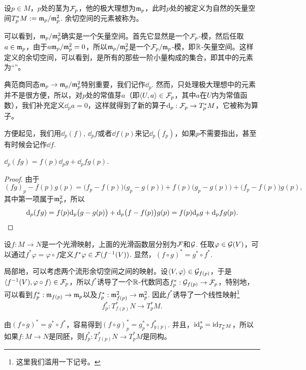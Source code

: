 \begin{para}[余切空间]
设$p\in M$，$p$处的茎为$\mathcal{F}_p$，他的极大理想为$\mathfrak{m}_p$，此时$p$处的被定义为自然的矢量空间$T_p^*M:=\mathfrak{m}_p/\mathfrak{m}_p^2$. 余切空间的元素被称为。
\end{para}

可以看到，$\mathfrak{m}_p/\mathfrak{m}_p^2$确实是一个矢量空间。首先它显然是一个$\mathcal{F}_p$-模，然后任取$a\in \mathfrak{m}_p$，由于$a\mathfrak{m}_p/\mathfrak{m}_p^2=0$，所以$\mathfrak{m}_p/\mathfrak{m}_p^2$是一个$\mathcal{F}_p/\mathfrak{m}_p$-模，即$\mathbb{R}$-矢量空间。这样定义的余切空间，可以看到，是所有的那些一阶小量构成的集合，即其中的元素为“”。

\begin{para}[微分算子]
典范商同态$\mathfrak{m}_p\to \mathfrak{m}_p/\mathfrak{m}_p^2$特别重要，我们记作$\dd_p$. 然而，只处理极大理想中的元素并不是很方便，所以，对$p$处的常值芽$a$（即$\langle U,a\rangle\in\mathcal{F}_p$，其中$a$在$U$内为常值函数），我们补充定义$\dd_pa=0$，这样就得到了新的算子$\mathrm{d}_p:\mathcal{F}_p\to T_p^*M$，它被称为算子。
\end{para}

方便起见，我们用$\dd_p(f)$, $\dd_pf$或者$\dd f(p)$来记$\dd_p(f_p)$，如果$p$不需要指出，甚至有时候会记作$\dd f$. 

\begin{pro}[Leibniz法则]
$\dd_p (fg)=f(p)\dd_pg+\dd_pf g(p)$.
\end{pro}


\begin{proof}
由于
\[
	(fg)_p-f(p)g(p)=\bigl(f_p-f(p)\bigr)\bigl(g_p-g(p)\bigr)+f(p)\bigl(g_p-g(p)\bigr)+\bigl(f_p-f(p)\bigr)g(p),
\]
其中第一项属于$\mathfrak{m}_p^2$，所以
\[
\mathrm{d}_p (fg)=f(p)\mathrm{d}_p\bigl(g-g(p)\bigr)+\mathrm{d}_p\bigl(f-f(p)\bigr)g(p)=f(p)\mathrm{d}_pg+\mathrm{d}_pf g(p).\qedhere
\]
\end{proof}

\begin{para}[拉回映射]
设$f:M\to N$是一个光滑映射，上面的光滑函数层分别为$\mathcal{F}$和$\mathcal{G}$. 任取$\varphi\in \mathcal{G}(V)$，可以通过$f^*\varphi=\varphi\circ f$定义$f^*\varphi\in \mathcal{F}(f^{-1}(V))$. 显然，$(f\circ g)^*=g^*\circ f^*$.

局部地，可以考虑两个流形余切空间之间的映射。设$\langle V,\varphi\rangle\in \mathcal{G}_{f(p)}$，于是$\langle f^{-1}(V),\varphi\circ f\rangle\in \mathcal{F}_p$，所以$f^*$诱导了一个$\mathbb{R}$-代数同态$f^*_p:\mathcal{G}_{f(p)}\to \mathcal{F}_p$，特别地，可以看到$f^*_p:\mathfrak{m}_{f(p)}\to \mathfrak{m}_{p}$以及$f^*_p:\mathfrak{m}^2_{f(p)}\to \mathfrak{m}^2_{p}$. 因此$f^*$诱导了一个线性映射\footnote{这里我们滥用一下记号。}
\[
	f^*_p:T_{f(p)}^*N\to T_p^*M.
\]

由$(f\circ g)^*=g^*\circ f^*$，容易得到$(f\circ g)^*_p=g^*_p\circ f^*_{g(p)}$. 并且，$\operatorname{id}^*_p=\operatorname{id}_{T_p^*M}$，所以如果$f:M\to N$是同胚，则$f_p^*:T_{f(p)}^*N\to T_p^*M$是同构。
\end{para}

